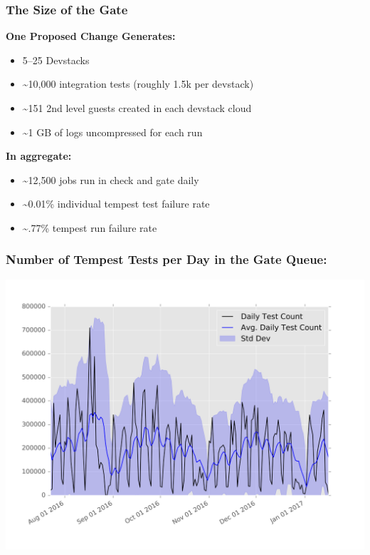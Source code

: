 \documentclass[aspectratio=169,11pt,hyperref={colorlinks=true}]{beamer}
\begin{document}
\begin{frame}
\frametitle{The Size of the Gate}
    \textbf{One Proposed Change Generates:}
      \begin{itemize}
        \item 5--25 Devstacks
        \item \textasciitilde10,000 integration tests (roughly 1.5k per devstack)
        \item \textasciitilde151 2nd level guests created in each devstack cloud
        \item \textasciitilde1 GB of logs uncompressed for each run
      \end{itemize}
      \textbf{In aggregate:}
      \begin{itemize}
        \item \textasciitilde12,500 jobs run in check and gate daily
        \item \textasciitilde0.01\% individual tempest test failure rate
        \item \textasciitilde.77\% tempest run failure rate
      \end{itemize}
\end{frame}

\begin{frame}
      \frametitle{Number of Tempest Tests per Day in the Gate Queue:}
    \begin{center}
      \includegraphics[width=.8\textwidth]{tempest-gate-count.png}
  \end{center}
\end{frame}
\end{document}
